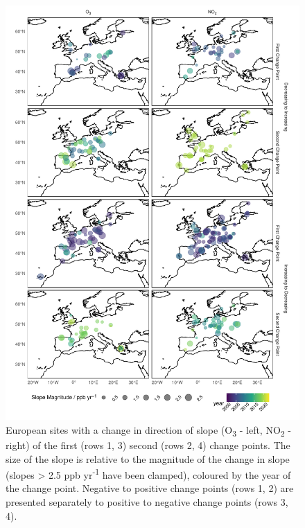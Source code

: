 \documentclass[journal abbreviation, manuscript]{copernicus}
\begin{document}
\begin{figure}[p]
\includegraphics[width=12cm,keepaspectratio]{figures/f9_eu_mag_map.pdf}
\caption{European sites with a change in direction of slope (O\textsubscript{3} - left, NO\textsubscript{2} - right) of the first (rows 1, 3) second (rows 2, 4) change points. The size of the slope is relative to the magnitude of the change in slope (slopes > 2.5 ppb yr\textsuperscript{-1} have been clamped), coloured by the year of the change point. Negative to positive change points (rows 1, 2) are presented separately to positive to negative change points (rows 3, 4).}
\label{fig:eu_changepoint_map}
\end{figure}
\end{document}
